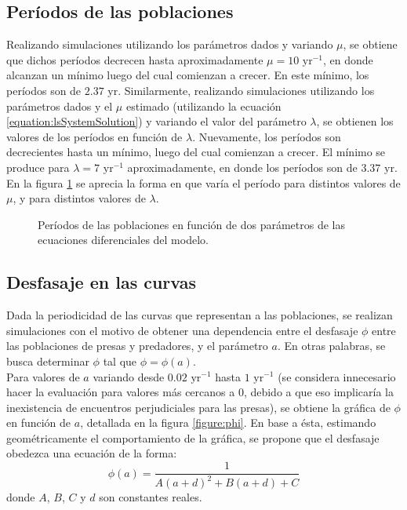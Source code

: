 \documentclass[journal, monochrome]{IEEEtran}
\begin{document}
\subsection{Períodos de las poblaciones}

Realizando simulaciones utilizando los parámetros dados y variando $\mu$, se obtiene que
dichos períodos decrecen hasta aproximadamente $\mu = 10 \text{ yr}^{-1}$, en donde alcanzan un mínimo luego del cual comienzan a crecer. En este mínimo, los períodos son de $2.37 \text{ yr}$. 
Similarmente, realizando simulaciones utilizando los parámetros dados y el $\mu$ estimado (utilizando la ecuación \ref{equation:lsSystemSolution}) y variando el valor del parámetro $\lambda$, se obtienen
los valores de los períodos en función de $\lambda$. Nuevamente, los períodos son decrecientes hasta un mínimo, luego del cual comienzan a crecer. El mínimo se produce para $\lambda = 7 \text{ yr}^{-1}$
aproximadamente, en donde los períodos son de $3.37 \text{ yr}$. En la figura \ref{figure:periods} se aprecia la forma en que varía el período para distintos valores de $\mu$, y para distintos valores de $\lambda$.

\begin{figure}[h]
	\centering
	\caption{Períodos de las poblaciones en función de dos parámetros de las ecuaciones diferenciales del modelo.}
	\label{figure:periods}
\end{figure}

\subsection{Desfasaje en las curvas}

Dada la periodicidad de las curvas que representan a las poblaciones, se realizan simulaciones con el motivo de obtener una dependencia 
entre el desfasaje $\phi$ entre las poblaciones de presas y predadores, y el parámetro $a$. En otras palabras, se busca determinar $\phi$ tal que $\phi = \phi(a)$.\\

Para valores de $a$ variando desde $0.02 \text{ yr}^{-1}$ hasta $1 \text{ yr}^{-1}$ (se considera innecesario hacer la evaluación para valores más cercanos a $0$, debido a que eso implicaría la inexistencia de encuentros 
perjudiciales para las presas), se obtiene la gráfica de $\phi$ en función de $a$, detallada en la figura \ref{figure:phi}.
En base a ésta, estimando geométricamente el comportamiento de la gráfica, se propone que el desfasaje obedezca una ecuación de la forma:
\begin{equation}
\phi(a) = \frac{1}{A (a + d)^2 + B (a + d) + C}
\label{equation:fi_eq2}
\end{equation}
donde $A$, $B$, $C$ y $d$ son constantes reales.\\
\end{document}

